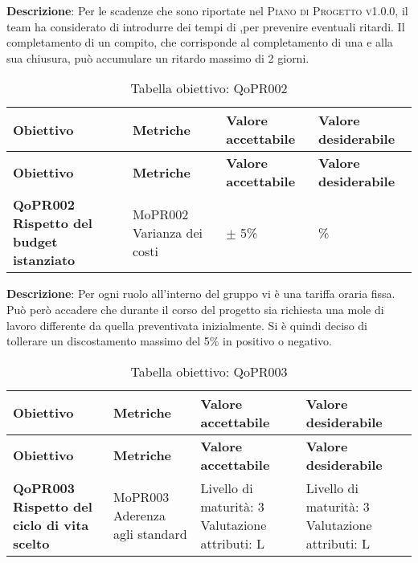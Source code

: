 \documentclass[../piano-di-qualifica.tex]{subfiles}
\begin{document}
\textbf{Descrizione}: Per le scadenze che sono riportate nel \textsc{Piano di Progetto v1.0.0}, il team ha considerato di introdurre dei tempi di ,per prevenire eventuali ritardi.  Il completamento di un compito, che corrisponde al completamento di una  e alla sua chiusura, può accumulare un ritardo massimo di 2 giorni.


\renewcommand{\arraystretch}{2} %
\begin{longtable}[H]{>{\centering\bfseries}m{5cm} >{\centering}m{5cm} >{\centering}m{2.5cm} >{\centering\arraybackslash}m{2.5cm}}  
    \caption{Tabella obiettivo: QoPR002}%
    \label{tab:requisiti_funzionali} \\
  \rowcolor{lightgray}
  {\textbf{Obiettivo}} & {\textbf{Metriche}} & {\textbf{Valore accettabile}} & {\textbf{Valore desiderabile}}  \\
  \endfirsthead%
  \rowcolor{lightgray}
  {\textbf{Obiettivo}} & {\textbf{Metriche}} & {\textbf{Valore accettabile}} & {\textbf{Valore desiderabile}}  \\
  \endhead%
  \textbf{QoPR002 Rispetto del budget istanziato} & MoPR002 Varianza dei costi & $\pm$ 5\% & 0\% \\
\end{longtable}

\textbf{Descrizione}: Per ogni ruolo all’interno del gruppo vi è una tariffa oraria fissa. Può però accadere che durante il corso del progetto sia richiesta una mole di lavoro differente da quella preventivata inizialmente. Si è quindi deciso di tollerare un discostamento massimo del 5\% in positivo o negativo.


\renewcommand{\arraystretch}{2} %
\begin{longtable}[H]{>{\centering\bfseries}m{5cm} >{\centering}m{5cm} >{\centering}m{2.5cm} >{\centering\arraybackslash}m{2.5cm}}  
    \caption{Tabella obiettivo: QoPR003}%
    \label{tab:requisiti_funzionali} \\
  \rowcolor{lightgray}
  {\textbf{Obiettivo}} & {\textbf{Metriche}} & {\textbf{Valore accettabile}} & {\textbf{Valore desiderabile}}  \\
  \endfirsthead%
  \rowcolor{lightgray}
  {\textbf{Obiettivo}} & {\textbf{Metriche}} & {\textbf{Valore accettabile}} & {\textbf{Valore desiderabile}}  \\
  \endhead%
  \textbf{QoPR003 Rispetto del ciclo di vita scelto} & MoPR003 Aderenza agli standard & Livello di maturità: 3 Valutazione attributi: L & Livello di maturità: 3 Valutazione attributi: L \\
\end{longtable}
\end{document}
